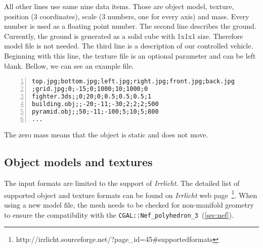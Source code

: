 All other lines use same nine data items. Those are object model, texture, position (3 coordinates), scale (3 numbers, one for every axis) and mass. Every number is used as a floating point number.
The second line describes the ground. Currently, the ground is generated as a solid cube with 1x1x1 size. Therefore model file is not needed. The third line is a description of our controlled vehicle. Beginning with this line, the texture file is an optional parameter and can be left blank. Bellow, we can see an example file.

\begin{centering}
\begin{Verbatim}[frame=single,numbers=left,xleftmargin=5mm]
top.jpg;bottom.jpg;left.jpg;right.jpg;front.jpg;back.jpg
;grid.jpg;0;-15;0;1000;10;1000;0
fighter.3ds;;0;20;0;0.5;0.5;0.5;1
building.obj;;-20;-11;-30;2;2;2;500
pyramid.obj;;50;-11;-100;5;10;5;800
...
\end{Verbatim}
\end{centering}
The zero mass means that the object is static and does not move.

\subsection*{Object models and textures}
The input formats are limited to the support of \emph{Irrlicht}. The detailed list of supported object and texture formats can be found on \emph{Irrlicht} web page~\footnote{http://irrlicht.sourceforge.net/?page\_id=45\#supportedformats}. When using a new model file, the mesh needs to be checked for non-manifold geometry to ensure the compatibility with the {\tt CGAL::Nef\_polyhedron\_3}~(\cref{sec:nef}).



